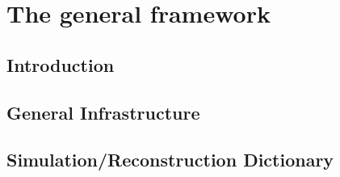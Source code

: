\chapter{The general framework}

\section{Introduction}
\section{General Infrastructure}
\section{Simulation/Reconstruction Dictionary}




